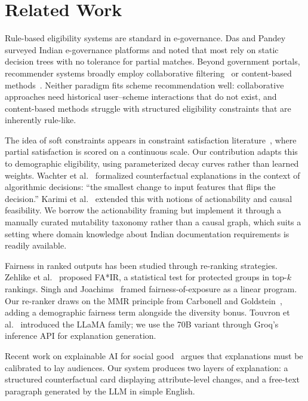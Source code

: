 \documentclass[conference]{IEEEtran}
\begin{document}
\section{Related Work}

Rule-based eligibility systems are standard in e-governance. Das and Pandey~\cite{das2018egovernance} surveyed Indian e-governance platforms and noted that most rely on static decision trees with no tolerance for partial matches. Beyond government portals, recommender systems broadly employ collaborative filtering~\cite{koren2009matrix} or content-based methods~\cite{lops2011content}. Neither paradigm fits scheme recommendation well: collaborative approaches need historical user--scheme interactions that do not exist, and content-based methods struggle with structured eligibility constraints that are inherently rule-like.

The idea of soft constraints appears in constraint satisfaction literature~\cite{meseguer2006soft}, where partial satisfaction is scored on a continuous scale. Our contribution adapts this to demographic eligibility, using parameterized decay curves rather than learned weights. Wachter et al.~\cite{wachter2018counterfactual} formalized counterfactual explanations in the context of algorithmic decisions: ``the smallest change to input features that flips the decision.'' Karimi et al.~\cite{karimi2020survey} extended this with notions of actionability and causal feasibility. We borrow the actionability framing but implement it through a manually curated mutability taxonomy rather than a causal graph, which suits a setting where domain knowledge about Indian documentation requirements is readily available.

Fairness in ranked outputs has been studied through re-ranking strategies. Zehlike et al.~\cite{zehlike2017fair} proposed FA*IR, a statistical test for protected groups in top-$k$ rankings. Singh and Joachims~\cite{singh2018fairness} framed fairness-of-exposure as a linear program. Our re-ranker draws on the MMR principle from Carbonell and Goldstein~\cite{carbonell1998mmr}, adding a demographic fairness term alongside the diversity bonus. Touvron et al.~\cite{touvron2023llama} introduced the LLaMA family; we use the 70B variant through Groq's inference API for explanation generation.

Recent work on explainable AI for social good~\cite{ehsan2020human} argues that explanations must be calibrated to lay audiences. Our system produces two layers of explanation: a structured counterfactual card displaying attribute-level changes, and a free-text paragraph generated by the LLM in simple English.
\end{document}

